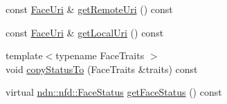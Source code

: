 \begin{DoxyCompactItemize}
\item 
const \hyperlink{classndn_1_1util_1_1FaceUri}{Face\+Uri} \& \hyperlink{classnfd_1_1Face_a75cd2637271a0ca41f8d113ef62bb951}{get\+Remote\+Uri} () const
\item 
const \hyperlink{classndn_1_1util_1_1FaceUri}{Face\+Uri} \& \hyperlink{classnfd_1_1Face_a52d85e0029c5ce4e6bfdf599877f413e}{get\+Local\+Uri} () const
\item 
{\footnotesize template$<$typename Face\+Traits $>$ }\\void \hyperlink{classnfd_1_1Face_a9c9d719ecce89d324a00ef99bb76682a}{copy\+Status\+To} (Face\+Traits \&traits) const
\item 
virtual \hyperlink{classndn_1_1nfd_1_1FaceStatus}{ndn\+::nfd\+::\+Face\+Status} \hyperlink{classnfd_1_1Face_a7ee5b5181e2e0c11b77d9b051b17755d}{get\+Face\+Status} () const
\end{DoxyCompactItemize}

